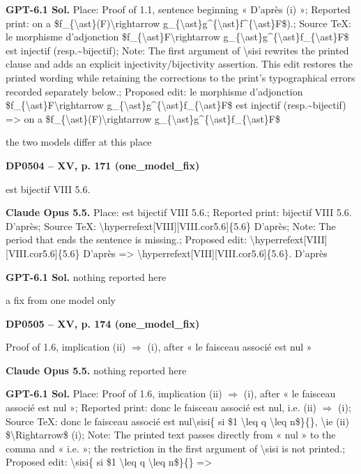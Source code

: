 \textbf{GPT-6.1 Sol.} Place: Proof of 1.1, sentence beginning « D'après (i) »; Reported print: on a \$f\_\{\textbackslash{}ast\}(F)\textbackslash{}rightarrow g\_\{\textbackslash{}ast\}g\textasciicircum{}\{\textbackslash{}ast\}f\textasciicircum{}\{\textbackslash{}ast\}F\$).; Source TeX: le morphisme d'adjonction \$f\_\{\textbackslash{}ast\}F\textbackslash{}rightarrow g\_\{\textbackslash{}ast\}g\textasciicircum{}\{\textbackslash{}ast\}f\_\{\textbackslash{}ast\}F\$ est injectif (resp.\textasciitilde{}bijectif); Note: The first argument of \textbackslash{}sisi rewrites the printed clause and adds an explicit injectivity/bijectivity assertion. This edit restores the printed wording while retaining the corrections to the print's typographical errors recorded separately below.; Proposed edit: le morphisme d'adjonction \$f\_\{\textbackslash{}ast\}F\textbackslash{}rightarrow g\_\{\textbackslash{}ast\}g\textasciicircum{}\{\textbackslash{}ast\}f\_\{\textbackslash{}ast\}F\$ est injectif (resp.\textasciitilde{}bijectif) =\allowbreak > on a \$f\_\{\textbackslash{}ast\}(F)\textbackslash{}rightarrow g\_\{\textbackslash{}ast\}g\textasciicircum{}\{\textbackslash{}ast\}f\_\{\textbackslash{}ast\}F\$\par
the two models differ at this place\par
\par\noindent\hypertarget{DP0504}{}\textbf{DP0504 -- XV, p. 171 (one\_model\_fix)}\par
est bijectif VIII 5.6.\par
\textbf{Claude Opus 5.5.} Place: est bijectif VIII 5.6.; Reported print: bijectif VIII 5.6. D'après; Source TeX: \textbackslash{}hyperrefext[VIII][VIII.cor5.6]\{5.6\} D'après; Note: The period that ends the sentence is missing.; Proposed edit: \textbackslash{}hyperrefext[VIII][VIII.cor5.6]\{5.6\} D'après =\allowbreak > \textbackslash{}hyperrefext[VIII][VIII.cor5.6]\{5.6\}. D'après\par
\textbf{GPT-6.1 Sol.} nothing reported here\par
a fix from one model only\par
\par\noindent\hypertarget{DP0505}{}\textbf{DP0505 -- XV, p. 174 (one\_model\_fix)}\par
Proof of 1.6, implication (ii) \ensuremath{\Rightarrow} (i), after « le faisceau associé est nul »\par
\textbf{Claude Opus 5.5.} nothing reported here\par
\textbf{GPT-6.1 Sol.} Place: Proof of 1.6, implication (ii) \ensuremath{\Rightarrow} (i), after « le faisceau associé est nul »; Reported print: donc le faisceau associé est nul, i.e. (ii) \ensuremath{\Rightarrow} (i); Source TeX: donc le faisceau associé est nul\textbackslash{}sisi\{ si \$1 \textbackslash{}leq q \textbackslash{}leq n\$\}\{\}, \textbackslash{}ie (ii) \$\textbackslash{}Rightarrow\$ (i); Note: The printed text passes directly from « nul » to the comma and « i.e. »; the restriction in the first argument of \textbackslash{}sisi is not printed.; Proposed edit: \textbackslash{}sisi\{ si \$1 \textbackslash{}leq q \textbackslash{}leq n\$\}\{\} =\allowbreak > \par
